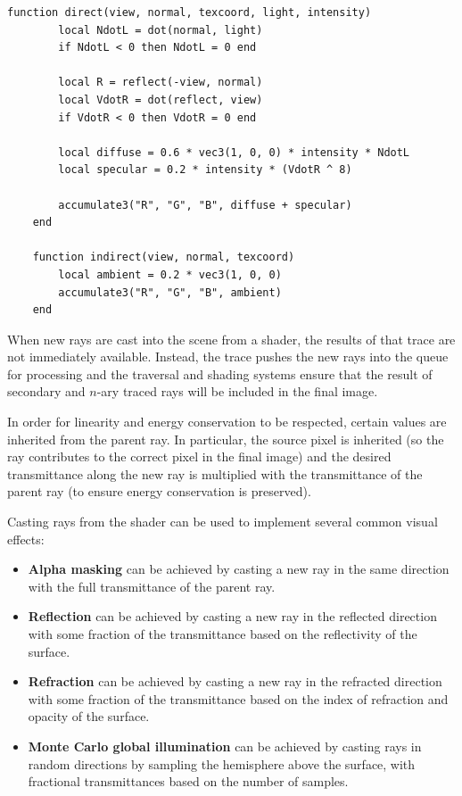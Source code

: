 \documentclass[12pt]{ucthesis}
\begin{document}
\begin{lstlisting}[caption=Example of a simple Phong shader.,label=phongshader]
    function direct(view, normal, texcoord, light, intensity)
        local NdotL = dot(normal, light)
        if NdotL < 0 then NdotL = 0 end
    
        local R = reflect(-view, normal)
        local VdotR = dot(reflect, view)
        if VdotR < 0 then VdotR = 0 end
    
        local diffuse = 0.6 * vec3(1, 0, 0) * intensity * NdotL
        local specular = 0.2 * intensity * (VdotR ^ 8)
    
        accumulate3("R", "G", "B", diffuse + specular)
    end
    
    function indirect(view, normal, texcoord)
        local ambient = 0.2 * vec3(1, 0, 0)
        accumulate3("R", "G", "B", ambient)
    end
\end{lstlisting}

When new rays are cast into the scene from a shader, the results of that trace
are not immediately available. Instead, the trace pushes the new rays into the
queue for processing and the traversal and shading systems ensure that the
result of secondary and $n$-ary traced rays will be included in the final image.

In order for linearity and energy conservation to be respected, certain values
are inherited from the parent ray. In particular, the source pixel is inherited
(so the ray contributes to the correct pixel in the final image) and the
desired transmittance along the new ray is multiplied with the transmittance of
the parent ray (to ensure energy conservation is preserved).

Casting rays from the shader can be used to implement several common visual
effects:

\begin{itemize}
    \item \textbf{Alpha masking} can be achieved by casting a new ray in the
        same direction with the full transmittance of the parent ray.
    \item \textbf{Reflection} can be achieved by casting a new ray in the
        reflected direction with some fraction of the transmittance based on
        the reflectivity of the surface.
    \item \textbf{Refraction} can be achieved by casting a new ray in the
        refracted direction with some fraction of the transmittance based on
        the index of refraction and opacity of the surface.
    \item \textbf{Monte Carlo global illumination} can be achieved by casting
        rays in random directions by sampling the hemisphere above the surface,
        with fractional transmittances based on the number of samples.
\end{itemize}
\end{document}
